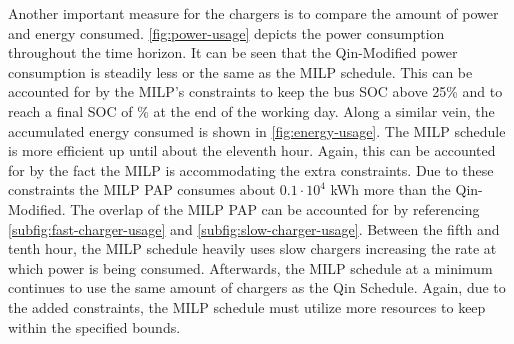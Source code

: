 \documentclass[ee,thesis]{usuthesis}
\newcommand{\bcharge}{0.7 }                                                     %
\newcommand{\mincharge}{25\% }                                                  %
\begin{document}
Another important measure for the chargers is to compare the amount of power and energy consumed.
\autoref{fig:power-usage} depicts the power consumption throughout the time horizon. It can be seen that the
Qin-Modified power consumption is steadily less or the same as the MILP schedule. This can be accounted for by the
MILP's constraints to keep the bus SOC above \mincharge and to reach a final SOC of \fpeval{\bcharge *100}\% at the end
of the working day. Along a similar vein, the accumulated energy consumed is shown in \autoref{fig:energy-usage}. The
MILP schedule is more efficient up until about the eleventh hour. Again, this can be accounted for by the fact the MILP
is accommodating the extra constraints. Due to these constraints the MILP PAP consumes about \(0.1\cdot10^4\) kWh more than
the Qin-Modified. The overlap of the MILP PAP can be accounted for by referencing \autoref{subfig:fast-charger-usage}
and \autoref{subfig:slow-charger-usage}. Between the fifth and tenth hour, the MILP schedule heavily uses slow chargers
increasing the rate at which power is being consumed. Afterwards, the MILP schedule at a minimum continues to use the
same amount of chargers as the Qin Schedule. Again, due to the added constraints, the MILP schedule must utilize more
resources to keep within the specified bounds.
\end{document}
